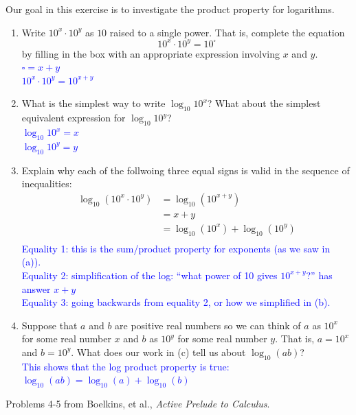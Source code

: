 \documentclass{ximera}
\begin{document}
\begin{exercise}
    Our goal in this exercise is to investigate the product property for logarithms.
    \begin{enumerate}
        \item Write $10^x\cdot 10^y$ as $10$ raised to a single power.  That is, complete the equation \[10^x\cdot 10^y = 10^{\square}\]
        by filling in the box with an appropriate expression involving $x$ and $y$.\\
        \textcolor{blue}{$\square=x+y$\\
        $10^x\cdot 10^y = 10^{x+y}$}
        \item What is the simplest way to write $\log_{10}10^x$?  What about the simplest equivalent expression for $\log_{10}10^y$?\\
        \textcolor{blue}{$\log_{10}10^x=x$\\
        $\log_{10}10^y=y$}
        \item Explain why each of the follwoing three equal signs is valid in the sequence of inequalities:
        \begin{align}
            \log_{10}(10^x\cdot 10^y) & =\log_{10}(10^{x+y})\\
            &=x+y\\
            &= \log_{10}(10^x) + \log_{10}(10^y)\\
        \end{align}
        \textcolor{blue}{Equality 1: this is the sum/product property for exponents (as we saw in (a)).\\
        Equality 2: simplification of the log: ``what power of 10 gives $10^{x+y}$?'' has answer $x+y$\\
        Equality 3: going backwards from equality 2, or how we simplified in (b).}
        \item Suppose that $a$ and $b$ are positive real numbers so we can think of $a$ as $10^x$ for some real number $x$ and $b$ as $10^y$ for some real number $y$. That is, $a=10^x$ and $b=10^y$. What does our work in (c) tell us about $\log_{10}(ab)$?\\
        \textcolor{blue}{This shows that the log product property is true: $\log_{10}(ab)=\log_{10}(a)+\log_{10}(b)$ }
    \end{enumerate}
\end{exercise}

Problems 4-5 from Boelkins, et al., \textit{Active Prelude to Calculus}.
\end{document}
